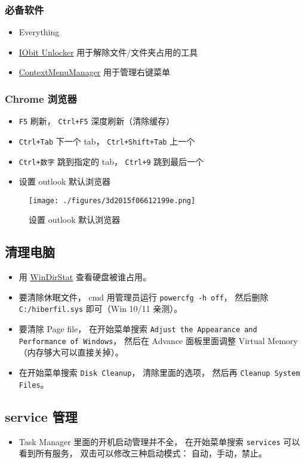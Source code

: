 \subsubsection{必备软件}
\begin{itemize}
\item Everything
\item \href{https://www.iobit.com/en/iobit-unlocker.php}{IObit Unlocker} 用于解除文件/文件夹占用的工具
\item \href{https://github.com/BluePointLilac/ContextMenuManager}{ContextMenuManager} 用于管理右键菜单
\end{itemize}

\subsubsection{Chrome 浏览器}
\begin{itemize}
\item \verb`F5` 刷新， \verb`Ctrl+F5` 深度刷新（清除缓存）
\item \verb`Ctrl+Tab` 下一个 tab， \verb`Ctrl+Shift+Tab` 上一个
\item \verb`Ctrl+数字` 跳到指定的 tab， \verb`Ctrl+9` 跳到最后一个
\item 设置 outlook 默认浏览器
\end{itemize}
\begin{figure}[ht]
\centering
\texttt{[image: ./figures/3d2015f06612199e.png]}
\caption{设置 outlook 默认浏览器} \label{fig_WinNt_2}
\end{figure}


\subsection{清理电脑}
\begin{itemize}
\item 用 \href{https://windirstat.net/}{WinDirStat} 查看硬盘被谁占用。
\item 要清除休眠文件， cmd 用管理员运行 \verb`powercfg -h off`， 然后删除 \verb`C:/hiberfil.sys` 即可（Win 10/11 亲测）。
\item 要清除 Page file， 在开始菜单搜索 \verb`Adjust the Appearance and Performance of Windows`， 然后在 Advance 面板里面调整 Virtual Memory（内存够大可以直接关掉）。
\item 在开始菜单搜索 \verb`Disk Cleanup`， 清除里面的选项， 然后再 \verb`Cleanup System Files`。
\end{itemize}

\subsection{service 管理}
\begin{itemize}
\item Task Manager 里面的开机启动管理并不全， 在开始菜单搜索 \verb`services` 可以看到所有服务， 双击可以修改三种启动模式： 自动，手动，禁止。
\end{itemize}

